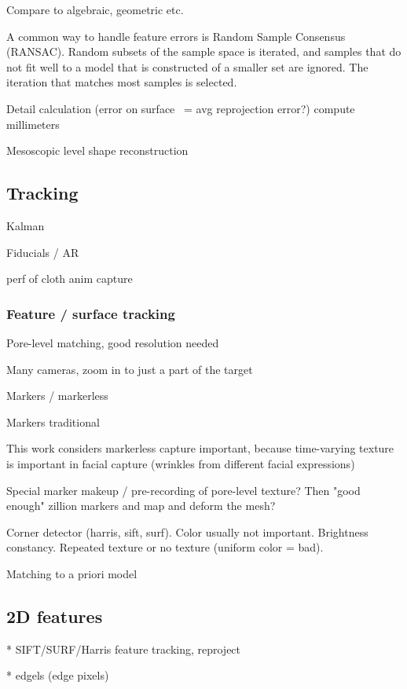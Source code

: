 Compare to algebraic, geometric etc.

A common way to handle feature errors is Random Sample Consensus (RANSAC). Random subsets of the sample space is iterated, and samples that do not fit well to a model that is constructed of a smaller set are ignored. The iteration that matches most samples is selected.

Detail calculation (error on surface ~= avg reprojection error?) compute millimeters

Mesoscopic level shape reconstruction

\subsection{Tracking}

Kalman

Fiducials / AR

perf of cloth anim capture

\subsubsection{Feature / surface tracking}

Pore-level matching, good resolution needed

Many cameras, zoom in to just a part of the target

Markers / markerless

Markers traditional


This work considers markerless capture important, because time-varying texture is important in facial capture (wrinkles from different facial expressions)

Special marker makeup / pre-recording of pore-level texture? Then "good enough" zillion markers and map and deform the mesh?

Corner detector (harris, sift, surf). Color usually not important. Brightness constancy. Repeated texture or no texture (uniform color = bad).

Matching to a priori model

\subsection{2D features}

* SIFT/SURF/Harris feature tracking, reproject

* edgels (edge pixels)

